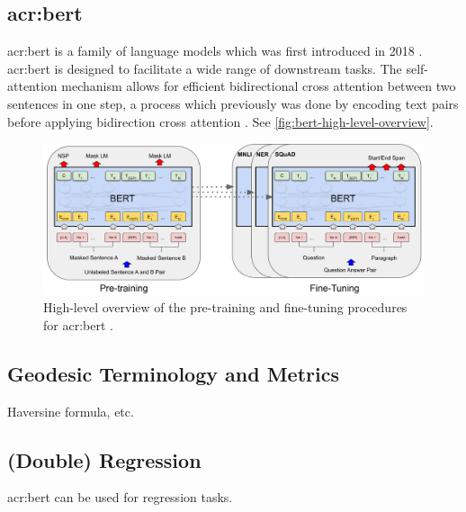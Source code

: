 \subsection[BERT]{\acrshort{acr:bert}}

\gls{acr:bert} is a family of language models which was first introduced in 2018 \citep{devlinBERTPretrainingDeep2019}.
\acrshort{acr:bert} is designed to facilitate a wide range of downstream tasks. The self-attention mechanism allows for efficient bidirectional cross attention between two sentences in one step, a process which previously was done by encoding text pairs before applying bidirection cross attention \citep[5]{devlinBERTPretrainingDeep2019}. See \autoref{fig:bert-high-level-overview}.

\begin{figure}
    \centering
    \includegraphics*[width=\textwidth]{./figs/BERT_overall_procedures.jpg}
    \caption{High-level overview of the pre-training and fine-tuning procedures for \acrshort{acr:bert} \citep[3]{devlinBERTPretrainingDeep2019}.}
    \label{fig:bert-high-level-overview}
\end{figure}

\subsection{}

\subsection{Geodesic Terminology and Metrics}

Haversine formula, etc.

\subsection{(Double) Regression}

\acrshort{acr:bert} can be used for regression tasks.
